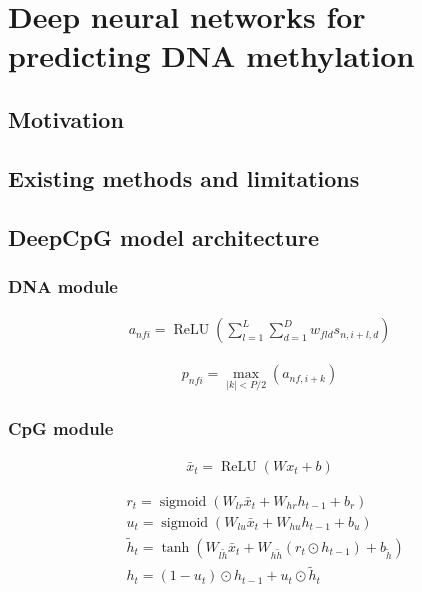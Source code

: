 \chapter{Deep neural networks for predicting DNA methylation}

\ifpdf
    \graphicspath{{Chapter4/Figs/Raster/}{Chapter4/Figs/PDF/}{Chapter4/Figs/}}
\else
    \graphicspath{{Chapter4/Figs/Vector/}{Chapter4/Figs/}}
\fi

\section{Motivation}

\section{Existing methods and limitations}

\section{DeepCpG model architecture}

\subsection{DNA module}

\begin{align}
  a_{nfi}=\operatorname{ReLU}(\sum_{l=1}^L \sum_{d=1}^D w_{fld} s_{n,i+l,d})
\end{align}

\begin{align}
  p_{nfi}=\max_{|k|<P/2}(a_{nf,i+k})
\end{align}


\subsection{CpG module}

\begin{align}
  \bar{x}_t=\operatorname{ReLU} (W x_t + b)
\end{align}

\begin{align}
  &r_t=\operatorname{sigmoid}(W_{lr} \bar{x}_t + W_{hr} h_{t-1} + b_{r}) \\
  &u_t=\operatorname{sigmoid}(W_{lu} \bar{x}_t + W_{hu} h_{t-1} + b_{u}) \\
  &\tilde{h}_t=\operatorname{tanh}\left(W_{l\tilde{h}} \bar{x}_t + W_{h\tilde{h}}(r_t \odot h_{t-1}) + b_{\tilde{h}}\right) \\
  &h_t = (1 - u_t) \odot h_{t-1} + u_t \odot \tilde{h}_t
\end{align}


